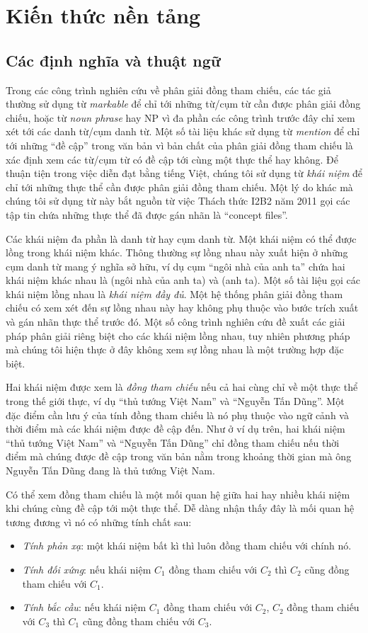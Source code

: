 \chapter{Kiến thức nền tảng}
\section{Các định nghĩa và thuật ngữ}
Trong các công trình nghiên cứu về phân giải đồng tham chiếu, các tác giả thường sử dụng từ \emph{markable} để chỉ tới những từ/cụm từ cần được phân giải đồng chiếu, hoặc từ \emph{noun phrase} hay NP vì đa phần các công trình trước đây chỉ xem xét tới các danh từ/cụm danh từ. Một số tài liệu khác sử dụng từ \emph{mention} để chỉ tới những ``đề cập'' trong văn bản vì bản chất của phân giải đồng tham chiếu là xác định xem các từ/cụm từ có đề cập tới cùng một thực thể hay không. Để thuận tiện trong việc diễn đạt bằng tiếng Việt, chúng tôi sử dụng từ \emph{khái niệm} để chỉ tới những thực thể cần được phân giải đồng tham chiếu. Một lý do khác mà chúng tôi sử dụng từ này bắt nguồn từ việc Thách thức I2B2 năm 2011 gọi các tập tin chứa những thực thể đã được gán nhãn là ``concept files''.

Các khái niệm đa phần là danh từ hay cụm danh từ. Một khái niệm có thể được lồng trong khái niệm khác. Thông thường sự lồng nhau này xuất hiện ở những cụm danh từ mang ý nghĩa sở hữu, ví dụ cụm ``ngôi nhà của anh ta'' chứa hai khái niệm khác nhau là (ngôi nhà của anh ta) và (anh ta). Một số tài liệu gọi các khái niệm lồng nhau là \emph{khái niệm đầy đủ}. Một hệ thống phân giải đồng tham chiếu có xem xét đến sự lồng nhau này hay không phụ thuộc vào bước trích xuất và gán nhãn thực thể trước đó. Một số công trình nghiên cứu đề xuất các giải pháp phân giải riêng biệt cho các khái niệm lồng nhau, tuy nhiên phương pháp mà chúng tôi hiện thực ở đây không xem sự lồng nhau là một trường hợp đặc biệt.

Hai khái niệm được xem là \emph{đồng tham chiếu} nếu cả hai cùng chỉ về một thực thể trong thế giới thực, ví dụ ``thủ tướng Việt Nam'' và ``Nguyễn Tấn Dũng''. Một đặc điểm cần lưu ý của tính đồng tham chiếu là nó phụ thuộc vào ngữ cảnh và thời điểm mà các khái niệm được đề cập đến. Như ở ví dụ trên, hai khái niệm ``thủ tướng Việt Nam'' và ``Nguyễn Tấn Dũng'' chỉ đồng tham chiếu nếu thời điểm mà chúng được đề cập trong văn bản nằm trong khoảng thời gian mà ông Nguyễn Tấn Dũng đang là thủ tướng Việt Nam.

Có thể xem đồng tham chiếu là một mối quan hệ giữa hai hay nhiều khái niệm khi chúng cùng đề cập tới một thực thể. Dễ dàng nhận thấy đây là mối quan hệ tương đương vì nó có những tính chất sau:
\begin{itemize}[noitemsep]
\item \emph{Tính phản xạ}: một khái niệm bất kì thì luôn đồng tham chiếu với chính nó.
\item \emph{Tính đối xứng}: nếu khái niệm $C_1$ đồng tham chiếu với $C_2$ thì $C_2$ cũng đồng tham chiếu với $C_1$.
\item \emph{Tính bắc cầu}: nếu khái niệm $C_1$ đồng tham chiếu với $C_2$, $C_2$ đồng tham chiếu với $C_3$ thì $C_1$ cũng đồng tham chiếu với $C_3$.
\end{itemize}

